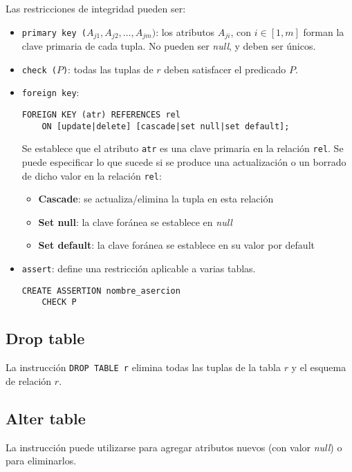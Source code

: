 \documentclass[a4paper, twoside]{article}
\begin{document}
Las restricciones de integridad pueden ser:
\begin{itemize}
\item \texttt{primary key ($A_{j1},A_{j2},\dots,A_{jm})$}: los atributos
$A_{ji}$, con $i\in[1,m]$ forman la clave primaria de cada tupla.
No pueden ser \emph{null}, y deben ser únicos.
\item \texttt{check ($P$)}: todas las tuplas de $r$ deben satisfacer el
predicado $P$.
\item \texttt{foreign key}:\texttt{}
\begin{lstlisting}
FOREIGN KEY (atr) REFERENCES rel
	ON [update|delete] [cascade|set null|set default];
\end{lstlisting}



Se establece que el atributo \texttt{atr} es una clave primaria en
la relación \texttt{rel}. Se puede especificar lo que sucede si se
produce una actualización o un borrado de dicho valor en la relación
\texttt{rel}:
\begin{itemize}
\item \textbf{Cascade}: se actualiza/elimina la tupla en esta relación
\item \textbf{Set null}: la clave foránea se establece en \emph{null}
\item \textbf{Set default}: la clave foránea se establece en su valor por
default
\end{itemize}
\item \texttt{assert}: define una restricción aplicable a varias tablas.


\begin{lstlisting}
CREATE ASSERTION nombre_asercion
	CHECK P
\end{lstlisting}


\end{itemize}

\subsection{Drop table}

La instrucción \texttt{DROP TABLE r} elimina todas las tuplas de la
tabla $r$ y el esquema de relación $r$.


\subsection{Alter table}

La instrucción puede utilizarse para agregar atributos nuevos (con
valor \emph{null}) o para eliminarlos.
\end{document}

